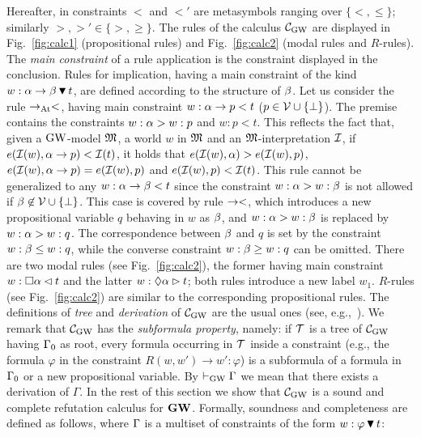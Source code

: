 Hereafter, in constraints $\lt$ and $\lt'$ are metasymbols ranging over
$\{<,\leq\}$; similarly $\gt,\gt' \in \{>,\geq\}$. The rules of the calculus
$\mathcal{C}_{\mathrm{GW}}$ are displayed in Fig.~\ref{fig:calc1} (propositional rules)
and Fig.~\ref{fig:calc2} (modal rules and $R$-rules).
The \emph{main constraint} of a rule application is the constraint
displayed in the conclusion.  Rules for implication, having a main
constraint of the kind $w:\alpha\to \beta\,\blacktriangledown\, t$, are defined
according to the structure of $\beta$.  Let us consider the rule
$\to_{\mathrm{At}}<$, having main constraint $w:\alpha\to p < t$
($p\in\mathcal{V}\cup\{\bot\}$). The premise contains the constraints $w:\alpha >
w:p$ and $w:p < t$.  This reflects the fact that, given a $\mbox{$\mathrm{GW}$}$-model
$\mathfrak{M}$, a world $w$ in $\mathfrak{M}$ and an $\mathfrak{M}$-interpretation $\mathcal{I}$, if
$e(\mathcal{I}(w), \alpha\to p) < \mathcal{I}(t)$, it holds that $e(\mathcal{I}(w),\alpha) >
e(\mathcal{I}(w),p)$, $e(\mathcal{I}(w), \alpha\to p) = e(\mathcal{I}(w),p)$ and
$e(\mathcal{I}(w),p) < \mathcal{I}(t)$.  This rule cannot be generalized to any
$w:\alpha\to \beta < t$ since the constraint $w:\alpha > w:\beta$ is not allowed if
$\beta\not\in\mathcal{V}\cup\{\bot\}$.  This case is covered by rule $\to<$,
which introduces a new propositional variable $q$ behaving in $w$ as
$\beta$, and $w:\alpha > w:\beta$ is replaced by $w:\alpha > w: q$.  The
correspondence between $\beta$ and $q$ is set by the constraint $w:\beta\leq
w:q$, while the converse constraint $w:\beta\geq w:q$ can be omitted.
There are two modal rules (see Fig.~\ref{fig:calc2}), the former
having main constraint $w:\Box\alpha \lhd t$ and the latter $w:\lozenge\alpha \rhd
t$; both rules introduce a new label $w_1$.  $R$-rules (see
Fig.~\ref{fig:calc2}) are similar to the corresponding propositional
rules.  The definitions of \emph{tree} and \emph{derivation} of
$\mathcal{C}_{\mathrm{GW}}$ are the usual ones (see, e.g.,~\cite{TroSch:00}).  We remark
that $\mathcal{C}_{\mathrm{GW}}$ has the \emph{subformula property}, namely: if $\mathcal{T}$
is a tree of $\mathcal{C}_{\mathrm{GW}}$ having $\Gamma_0$ as root, every formula occurring
in $\mathcal{T}$ inside a constraint (e.g., the formula $\varphi$ in the
constraint $R(w,w')\to w':\varphi$) is a subformula of a formula in
$\Gamma_0$ or a new propositional variable.  By $\vdash_{\mathrm{GW}} \Gamma$ we mean
that there exists a derivation of $\Gamma$.  In the rest of this
section we show that $\mathcal{C}_{\mathrm{GW}}$ is a sound and complete refutation
calculus for $\mathbf{GW}$. Formally, soundness and completeness are defined
as follows, where $\Gamma$ is a multiset of constraints of the form
$w:\varphi\,\blacktriangledown\, t$:


